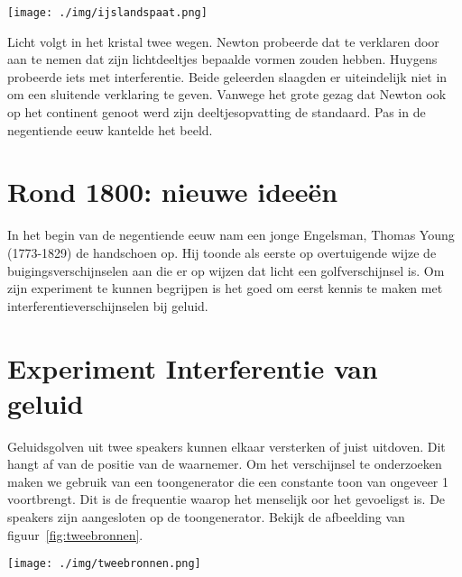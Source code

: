 {\begin{center}
\leavevmode
\texttt{[image: ./img/ijslandspaat.png]}
\end{center}

Licht volgt in het kristal twee wegen. Newton probeerde dat te verklaren door aan te nemen dat zijn lichtdeeltjes bepaalde vormen zouden hebben. Huygens probeerde iets met interferentie. Beide geleerden slaagden er uiteindelijk niet in om een sluitende verklaring te geven. Vanwege het grote gezag dat Newton ook op het continent genoot werd zijn deeltjesopvatting de standaard. Pas in de negentiende eeuw kantelde het beeld.

\section{Rond 1800: nieuwe idee\"en}
In het begin van de negentiende eeuw nam een jonge Engelsman, Thomas Young (1773-1829) de handschoen op. Hij toonde als eerste op overtuigende wijze de buigingsverschijnselen aan die er op wijzen dat licht een golfverschijnsel is. Om zijn experiment te kunnen begrijpen is het goed om eerst kennis te maken met interferentieverschijnselen bij geluid.

\section{Experiment Interferentie van geluid}
Geluidsgolven uit twee speakers kunnen elkaar versterken of juist uitdoven. Dit hangt af van de positie van de waarnemer. Om het verschijnsel te onderzoeken maken we gebruik van een toongenerator die een constante toon van ongeveer \SI{1}{\kilo\Herz} voortbrengt. Dit is de frequentie waarop het menselijk oor het gevoeligst is. De speakers zijn aangesloten op de toongenerator.
Bekijk de afbeelding van figuur~\ref{fig:tweebronnen}.



\begin{center}
\leavevmode
\texttt{[image: ./img/tweebronnen.png]}
\end{center}

}
